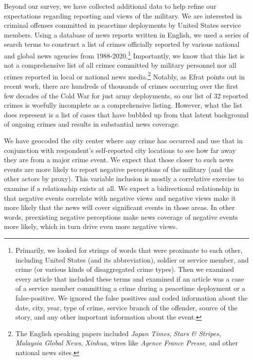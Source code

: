 Beyond our survey, we have collected additional data to help refine our expectations regarding reporting and views of the military. We are interested in criminal offenses committed in peacetime deployments by United States service members. Using a database of news reports written in English, we used a series of search terms to construct a list of crimes officially reported by various national and global news agencies from 1988-2020.\footnote{Primarily, we looked for strings of words that were proximate to each other, including United States (and its abbreviation), soldier or service member, and crime (or various kinds of disaggregated crime types). Then we examined every article that included these terms and examined if an article was a case of a service member committing a crime during a peacetime deployment or a false-positive. We ignored the false positives and coded information about the date, city, year, type of crime, service branch of the offender, source of the story, and any other important information about the event.} Importantly, we know that this list is not a comprehensive list of all crimes committed by military personnel nor all crimes reported in local or national news media.\footnote{The English speaking papers included \textit{Japan Times}, \textit{Stars \& Stripes}, \textit{Malaysia Global News}, \textit{Xinhua}, wires like \textit{Agence France Presse}, and other national news sites.} Notably, as Efrat points out in recent work, there are hundreds of thousands of crimes occurring over the first few decades of the Cold War for just army deployments, so our list of 32 reported crimes is woefully incomplete as a comprehensive listing.\cite{efrat2021a} However, what the list does represent is a list of cases that have bubbled up from that latent background of ongoing crimes and results in substantial news coverage. 

We have geocoded the city center where any crime has occurred and use that in conjunction with respondent's self-reported city locations to see how far away they are from a major crime event. We expect that those closer to such news events are more likely to report negative perceptions of the military (and the other actors by proxy). This variable inclusion is mostly a correlative exercise to examine if a relationship exists at all. We expect a bidirectional relationship in that negative events correlate with negative views and negative views make it more likely that the news will cover significant events in those areas. In other words, preexisting negative perceptions make news coverage of negative events more likely, which in turn drive even more negative views.



